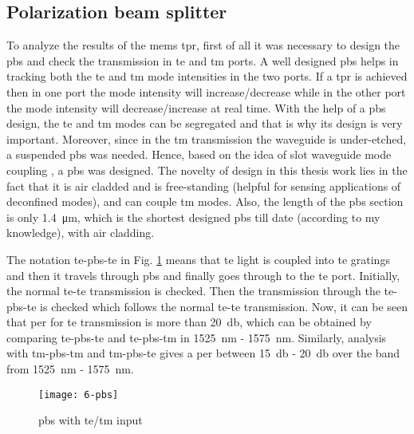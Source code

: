 \documentclass[../report.tex]{subfiles}
\begin{document}
	\subsection{Polarization beam splitter}
	To analyze the results of the \gls{mems} \gls{tpr}, first of all it was necessary to design the \gls{pbs} and check the transmission in \gls{te} and \gls{tm} ports. A well designed \gls{pbs} helps in tracking both the \gls{te} and \gls{tm} mode intensities in the two ports. If a \gls{tpr} is achieved then in one port the mode intensity will increase/decrease while in the other port the mode intensity will decrease/increase at real time. With the help of a \gls{pbs} design, the \gls{te} and \gls{tm} modes can be segregated and that is why its design is very important. Moreover, since in the \gls{tm} transmission the waveguide is under-etched, a suspended \gls{pbs} was needed. Hence, based on the idea of slot waveguide mode coupling \cite{pbs_dai_2011}, a \gls{pbs} was designed. The novelty of design in this thesis work lies in the fact that it is air cladded and is free-standing (helpful for sensing applications of deconfined modes), and can couple \gls{tm} modes. Also, the length of the \gls{pbs} section is only \SI{1.4}{\micro \meter}, which is the shortest designed \gls{pbs} till date (according to my knowledge), with air cladding.\par
	The notation \gls{te}-\gls{pbs}-\gls{te} in Fig. \ref{fig:6_pbs} means that \gls{te} light is coupled into \gls{te} gratings and then it travels through \gls{pbs} and finally goes through to the \gls{te} port. Initially, the normal \gls{te}-\gls{te} transmission is checked. Then the transmission through the \gls{te}-\gls{pbs}-\gls{te} is checked which follows the normal \gls{te}-\gls{te} transmission. Now, it can be seen that \gls{per} for \gls{te} transmission is more than \SI{20}{\decibel}, which can be obtained by comparing \gls{te}-\gls{pbs}-\gls{te} and \gls{te}-\gls{pbs}-\gls{tm} in \SI{1525}{\nano \meter} - \SI{1575}{\nano \meter}. Similarly, analysis with \gls{tm}-\gls{pbs}-\gls{tm} and \gls{tm}-\gls{pbs}-\gls{te} gives a \gls{per} between \SI{15}{\decibel} - \SI{20}{\decibel} over the band from \SI{1525}{\nano \meter} - \SI{1575}{\nano \meter}. 
	
	\begin{figure}[H] %
		\centering
		\texttt{[image: 6-pbs]}
		\caption{\gls{pbs} with \gls{te}/\gls{tm} input}
		\label{fig:6_pbs}
	\end{figure}
	
\end{document}
